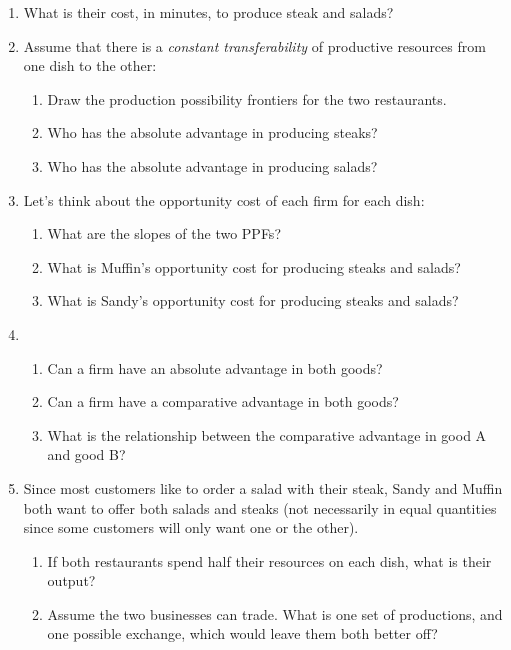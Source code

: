 \documentclass[12pt]{article}
\begin{document}
\begin{enumerate}

\item What is their cost, in minutes, to produce steak and salads?


\item Assume that there is a \textit{constant transferability} of productive resources from one dish to the other:
\begin{enumerate}
    \item Draw the production possibility frontiers for the two restaurants.
    \item Who has the absolute advantage in producing steaks?
    \item Who has the absolute advantage in producing salads?
\end{enumerate}


\item Let's think about the opportunity cost of each firm for each dish:
\begin{enumerate}
    \item What are the slopes of the two PPFs?
    \item What is Muffin's opportunity cost for producing steaks and salads?
    \item What is Sandy's opportunity cost for producing steaks and salads?
\end{enumerate}


\item 
\begin{enumerate}
    \item Can a firm have an absolute advantage in both goods?
    \item Can a firm have a comparative advantage in both goods?
    \item What is the relationship between the comparative advantage in good A and good B?
\end{enumerate}

\item Since most customers like to order a salad with their steak, Sandy and Muffin both want to offer both salads and steaks (not necessarily in equal quantities since some customers will only want one or the other).

\begin{enumerate}
    \item If both restaurants spend half their resources on each dish, what is their output?
    \item Assume the two businesses can trade. What is one set of productions, and one possible exchange, which would leave them both better off?
\end{enumerate}



\end{enumerate}
\end{document}
